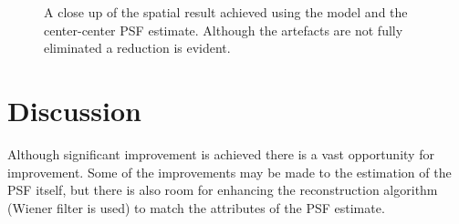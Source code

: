 \begin{figure}[h!]
    \caption{%
        A close up of the spatial result achieved using the model and the center-center \ac{PSF} estimate.
        Although the artefacts are not fully eliminated a reduction is evident.
    }
\end{figure}

\section{Discussion}%

Although significant improvement is achieved there is a vast opportunity for improvement.
Some of the improvements may be made to the estimation of the \ac{PSF} itself, but there is also room for enhancing the
    reconstruction algorithm (Wiener filter is used) to match the attributes of the \ac{PSF} estimate.

